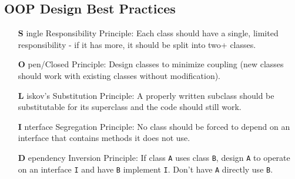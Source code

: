 \documentclass{article}
\begin{document}
\subsection{OOP Design Best Practices}
\begin{itemize}[align=right]
\item [\textbf{S}]ingle Responsibility Principle: Each class should
  have a single, limited responsibility - if it has more, it should be
  split into two+ classes.
\item [\textbf{O}]pen/Closed Principle: Design classes to minimize
  coupling (new classes should work with existing classes without modification).
\item [\textbf{L}]iskov's Substitution Principle: A properly written
  subclass should be substitutable for its superclass and the code
  should still work.
\item [\textbf{I}]nterface Segregation Principle: No class should be
  forced to depend on an interface that contains methods it does not use.
\item [\textbf{D}]ependency Inversion Principle: If class \texttt{A}
  uses class \texttt{B}, design \texttt{A} to operate on an interface \texttt{I}
  and have \texttt{B} implement \texttt{I}. Don't have \texttt{A}
  directly use \texttt{B}.
\end{itemize}
\end{document}
